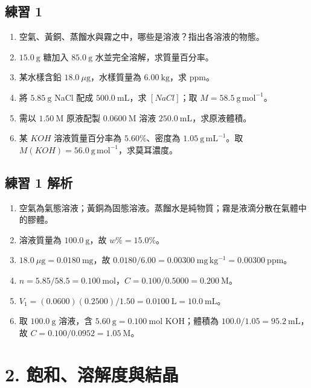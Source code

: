 \documentclass[11pt,a4paper]{article}
\providecommand{\tightlist}{%
  \setlength{\itemsep}{0pt}\setlength{\parskip}{0pt}}
\begin{document}
\subsection{練習 1}\label{ux7df4ux7fd2-1}

\begin{enumerate}
\def\labelenumi{\arabic{enumi}.}
\tightlist
\item
  空氣、黃銅、蒸餾水與霧之中，哪些是溶液？指出各溶液的物態。
\item
  \(15.0\ \mathrm g\) 糖加入 \(85.0\ \mathrm g\) 水並完全溶解，求質量百分率。
\item
  某水樣含鉛 \(18.0\ \mu\mathrm g\)，水樣質量為 \(6.00\ \mathrm{kg}\)，求 ppm。
\item
  將 \(5.85\ \mathrm g\) NaCl 配成 \(500.0\ \mathrm{mL}\)，求 \([NaCl]\)；取 \(M=58.5\ \mathrm{g\,mol^{-1}}\)。
\item
  需以 \(1.50\ \mathrm M\) 原液配製 \(0.0600\ \mathrm M\) 溶液 \(250.0\ \mathrm{mL}\)，求原液體積。
\item
  某 \(KOH\) 溶液質量百分率為 \(5.60\%\)、密度為 \(1.05\ \mathrm{g\,mL^{-1}}\)。取 \(M(KOH)=56.0\ \mathrm{g\,mol^{-1}}\)，求莫耳濃度。
\end{enumerate}

\subsection{練習 1 解析}\label{ux7df4ux7fd2-1-ux89e3ux6790}

\begin{enumerate}
\def\labelenumi{\arabic{enumi}.}
\tightlist
\item
  空氣為氣態溶液；黃銅為固態溶液。蒸餾水是純物質；霧是液滴分散在氣體中的膠體。
\item
  溶液質量為 \(100.0\ \mathrm g\)，故 \(w\%=15.0\%\)。
\item
  \(18.0\ \mu\mathrm g=0.0180\ \mathrm{mg}\)，故 \(0.0180/6.00=0.00300\ \mathrm{mg\,kg^{-1}}=0.00300\ \mathrm{ppm}\)。
\item
  \(n=5.85/58.5=0.100\ \mathrm{mol}\)，\(C=0.100/0.5000=0.200\ \mathrm M\)。
\item
  \(V_1=(0.0600)(0.2500)/1.50=0.0100\ \mathrm L=10.0\ \mathrm{mL}\)。
\item
  取 \(100.0\ \mathrm g\) 溶液，含 \(5.60\ \mathrm g=0.100\ \mathrm{mol}\) KOH；體積為 \(100.0/1.05=95.2\ \mathrm{mL}\)，故 \(C=0.100/0.0952=1.05\ \mathrm M\)。
\end{enumerate}

\section{2. 飽和、溶解度與結晶}\label{ux98fdux548cux6eb6ux89e3ux5ea6ux8207ux7d50ux6676}
\end{document}
